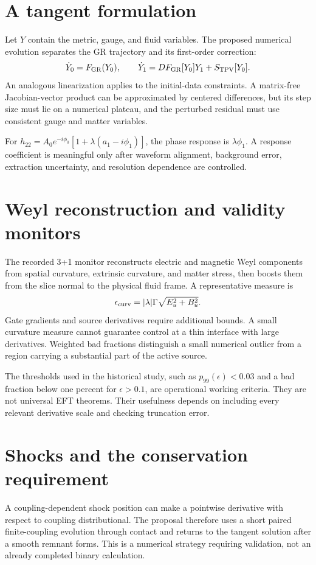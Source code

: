 \documentclass[11pt,oneside]{report}
\begin{document}
\section{A tangent formulation}
Let $Y$ contain the metric, gauge, and fluid variables. The proposed numerical evolution separates the GR trajectory and its first-order correction:
\begin{equation}
\dot Y_0=F_{\rm GR}(Y_0),\qquad
\dot Y_1=DF_{\rm GR}[Y_0]Y_1+S_{\rm TPV}[Y_0].
\end{equation}
An analogous linearization applies to the initial-data constraints. A matrix-free Jacobian-vector product can be approximated by centered differences, but its step size must lie on a numerical plateau, and the perturbed residual must use consistent gauge and matter variables.

For $h_{22}=A_0e^{-i\phi_0}[1+\lambda(a_1-i\phi_1)]$, the phase response is $\lambda\phi_1$. A response coefficient is meaningful only after waveform alignment, background error, extraction uncertainty, and resolution dependence are controlled.

\section{Weyl reconstruction and validity monitors}
The recorded 3+1 monitor reconstructs electric and magnetic Weyl components from spatial curvature, extrinsic curvature, and matter stress, then boosts them from the slice normal to the physical fluid frame. A representative measure is
\begin{equation}
\epsilon_{\rm curv}=|\lambda|\Gamma\sqrt{E_u^2+B_u^2}.
\end{equation}
Gate gradients and source derivatives require additional bounds. A small curvature measure cannot guarantee control at a thin interface with large derivatives. Weighted bad fractions distinguish a small numerical outlier from a region carrying a substantial part of the active source.

The thresholds used in the historical study, such as $p_{99}(\epsilon)<0.03$ and a bad fraction below one percent for $\epsilon>0.1$, are operational working criteria. They are not universal EFT theorems. Their usefulness depends on including every relevant derivative scale and checking truncation error.

\section{Shocks and the conservation requirement}
A coupling-dependent shock position can make a pointwise derivative with respect to coupling distributional. The proposal therefore uses a short paired finite-coupling evolution through contact and returns to the tangent solution after a smooth remnant forms. This is a numerical strategy requiring validation, not an already completed binary calculation.
\end{document}
